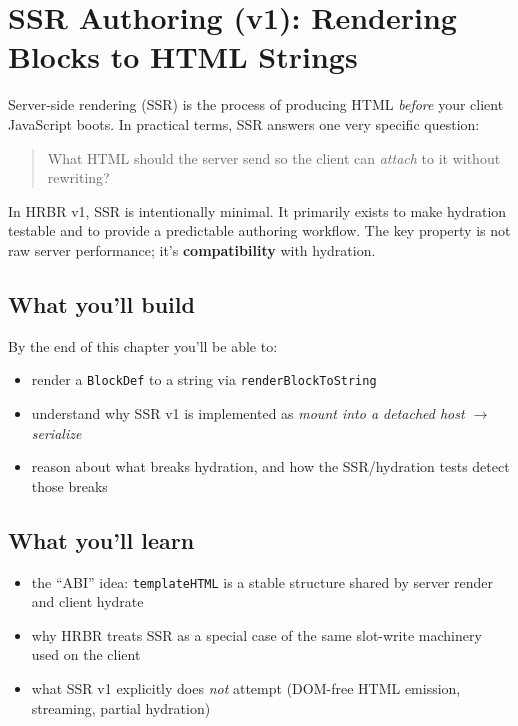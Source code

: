 \chapter{SSR Authoring (v1): Rendering Blocks to HTML Strings}

Server-side rendering (SSR) is the process of producing HTML \emph{before} your client JavaScript boots.
In practical terms, SSR answers one very specific question:

\begin{quote}
What HTML should the server send so the client can \emph{attach} to it without rewriting?
\end{quote}

In HRBR v1, SSR is intentionally minimal.
It primarily exists to make hydration testable and to provide a predictable authoring workflow.
The key property is not raw server performance; it’s \textbf{compatibility} with hydration.

\section{What you’ll build}

By the end of this chapter you’ll be able to:

\begin{itemize}
  \item render a \texttt{BlockDef} to a string via \texttt{renderBlockToString}
  \item understand why SSR v1 is implemented as \emph{mount into a detached host $\rightarrow$ serialize}
  \item reason about what breaks hydration, and how the SSR/hydration tests detect those breaks
\end{itemize}

\section{What you’ll learn}

\begin{itemize}
  \item the “ABI” idea: \texttt{templateHTML} is a stable structure shared by server render and client hydrate
  \item why HRBR treats SSR as a special case of the same slot-write machinery used on the client
  \item what SSR v1 explicitly does \emph{not} attempt (DOM-free HTML emission, streaming, partial hydration)
\end{itemize}

